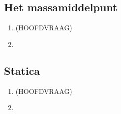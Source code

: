 \documentclass[12pt]{article}
\begin{document}
    \subsection{Het massamiddelpunt}
    \begin{enumerate}
        \item \textbf{} (HOOFDVRAAG)
        \item 
    \end{enumerate}
    \subsection{Statica}
    \begin{enumerate}
        \item \textbf{} (HOOFDVRAAG)
        \item                                                                                                                                                                                   
    \end{enumerate}
\end{document}
